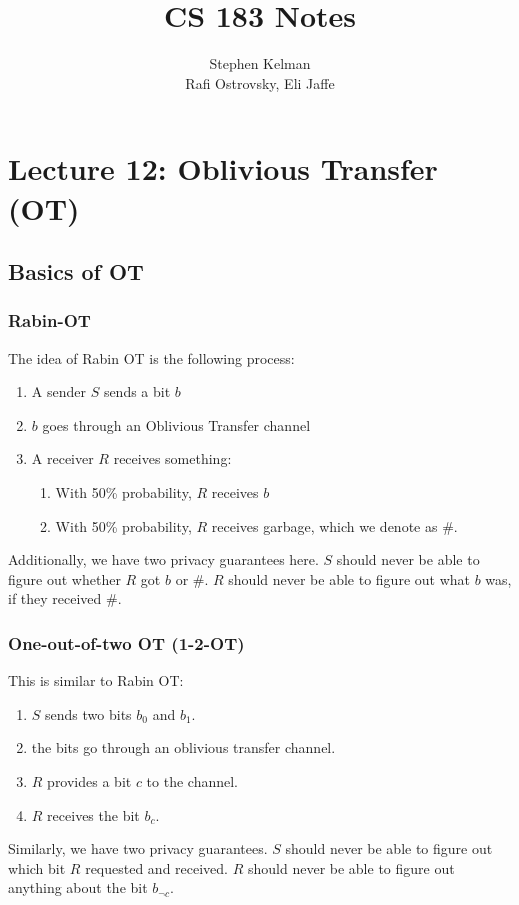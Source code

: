 \documentclass[11pt]{article}
\title{CS 183 Notes}
\author{Stephen Kelman\\ Rafi Ostrovsky, Eli Jaffe}
\begin{document}
\section{Lecture 12: Oblivious Transfer (OT)}

\subsection{Basics of OT}
\subsubsection{Rabin-OT}
The idea of Rabin OT is the following process:
\begin{enumerate}
\item A sender \(S\) sends a bit \(b\)
\item \(b\) goes through an Oblivious Transfer channel
\item A receiver \(R\) receives something:
\begin{enumerate}
\item With 50\% probability, \(R\) receives \(b\)
\item With 50\% probability, \(R\) receives garbage, which we denote as \(\#\).
\end{enumerate}
\end{enumerate}

Additionally, we have two privacy guarantees here.
\(S\) should never be able to figure out whether \(R\) got \(b\) or \(\#\).
\(R\) should never be able to figure out what \(b\) was, if they received \(\#\).

\subsubsection{One-out-of-two OT (1-2-OT)}
This is similar to Rabin OT:
\begin{enumerate}
\item \(S\) sends two bits \(b_0\) and \(b_1\).
\item the bits go through an oblivious transfer channel.
\item \(R\) provides a bit \(c\) to the channel.
\item \(R\) receives the bit \(b_c\).
\end{enumerate}

Similarly, we have two privacy guarantees.
\(S\) should never be able to figure out which bit \(R\) requested and received.
\(R\) should never be able to figure out anything about the bit \(b_{\neg{c}}\).
\end{document}
